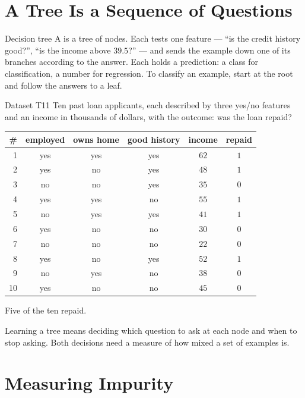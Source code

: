 \section{A Tree Is a Sequence of Questions}
\label{sec:tree-idea}

\begin{defbox}{Decision tree}
A  is a tree of nodes. Each  tests one
feature --- ``is the credit history good?'', ``is the income above $39.5$?'' ---
and sends the example down one of its branches according to the answer. Each
 holds a prediction: a class for classification, a number for
regression. To classify an example, start at the root and follow the answers to
a leaf.
\end{defbox}

\begin{defbox}{Dataset T11}
Ten past loan applicants, each described by three yes/no features and an income
in thousands of dollars, with the outcome: was the loan repaid?

\begin{center}
\small
\renewcommand{\arraystretch}{1.12}
\begin{tabular}{@{}rccccc@{}}
\toprule
\# & employed & owns home & good history & income & repaid\\
\midrule
1  & yes & yes & yes & $62$ & $1$\\
2  & yes & no  & yes & $48$ & $1$\\
3  & no  & no  & yes & $35$ & $0$\\
4  & yes & yes & no  & $55$ & $1$\\
5  & no  & yes & yes & $41$ & $1$\\
6  & yes & no  & no  & $30$ & $0$\\
7  & no  & no  & no  & $22$ & $0$\\
8  & yes & no  & yes & $52$ & $1$\\
9  & no  & yes & no  & $38$ & $0$\\
10 & yes & no  & no  & $45$ & $0$\\
\bottomrule
\end{tabular}
\end{center}
Five of the ten repaid.
\end{defbox}

Learning a tree means deciding which question to ask at each node and when to
stop asking. Both decisions need a measure of how mixed a set of examples is.

\section{Measuring Impurity}
\label{sec:impurity}

